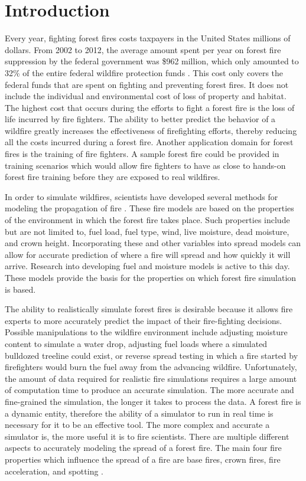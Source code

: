 \chapter{Introduction}

Every year, fighting forest fires costs taxpayers in the United States millions of dollars. From 2002 to 2012, the average amount spent per year on forest fire suppression by the federal government was \$962 million, which only amounted to 32\% of the entire federal wildfire protection funds \cite{forestcost}. This cost only covers the federal funds that are spent on fighting and preventing forest fires. It does not include the individual and environmental cost of loss of property and habitat. The highest cost that occurs during the efforts to fight a forest fire is the loss of life incurred by fire fighters. The ability to better predict the behavior of a wildfire greatly increases the effectiveness of firefighting efforts, thereby reducing all the costs incurred during a forest fire. Another application domain for forest fires is the training of fire fighters. A sample forest fire could be provided in training scenarios which would allow fire fighters to have as close to hands-on forest fire training before they are exposed to real wildfires. 

In order to simulate wildfires, scientists have developed several methods for modeling the propagation of fire \cite{roth}\cite{BEHAVE}\cite{1983roth}. These fire models are based on the properties of the environment in which the forest fire takes place. Such properties include but are not limited to, fuel load, fuel type, wind, live moisture, dead moisture, and crown height. Incorporating these and other variables into spread models can allow for accurate prediction of where a fire will spread and how quickly it will arrive. Research into developing fuel and moisture models is active to this day. These models provide the basis for the properties on which forest fire simulation is based.

The ability to realistically simulate forest fires is desirable because it allows fire experts to more accurately predict the impact of their fire-fighting decisions. Possible manipulations to the wildfire environment include adjusting moisture content to simulate a water drop, adjusting fuel loads where a simulated bulldozed treeline could exist, or reverse spread testing in which a fire started by firefighters would burn the fuel away from the advancing wildfire. Unfortunately, the amount of data required for realistic fire simulations requires a large amount of computation time to produce an accurate simulation. The more accurate and fine-grained the simulation, the longer it takes to process the data. A forest fire is a dynamic entity, therefore the ability of a simulator to run in real time is necessary for it to be an effective tool. The more complex and accurate a simulator is, the more useful it is to fire scientists. There are multiple different aspects to accurately modeling the spread of a forest fire. The main four fire properties which influence the spread of a fire are base fires, crown fires, fire acceleration, and spotting \cite{firereview}. 

